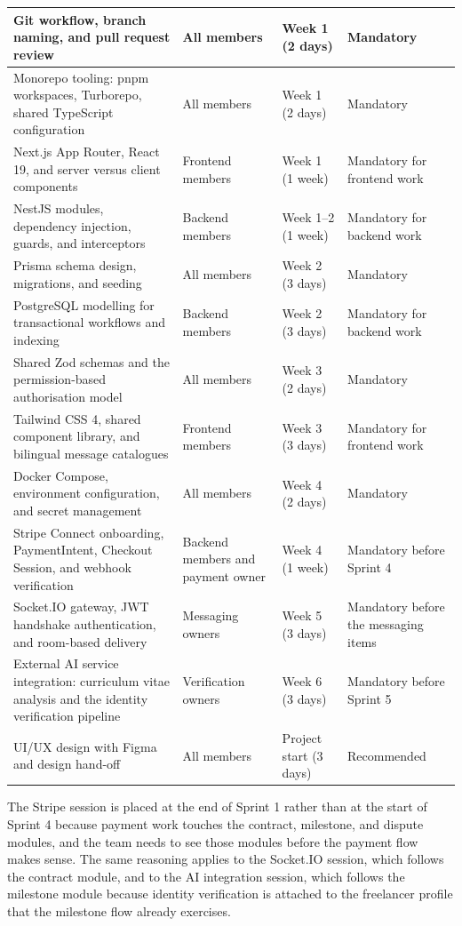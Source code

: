 \begin{longtable}{|>{\raggedright\arraybackslash}p{4.5cm}|>{\raggedright\arraybackslash}p{2.3cm}|>{\raggedright\arraybackslash}p{3.6cm}|>{\raggedright\arraybackslash}p{3.4cm}|}
Git workflow, branch naming, and pull request review & All members & Week 1 (2 days) & Mandatory \\
\hline
Monorepo tooling: pnpm workspaces, Turborepo, shared TypeScript configuration & All members & Week 1 (2 days) & Mandatory \\
\hline
Next.js App Router, React 19, and server versus client components & Frontend members & Week 1 (1 week) & Mandatory for frontend work \\
\hline
NestJS modules, dependency injection, guards, and interceptors & Backend members & Week 1--2 (1 week) & Mandatory for backend work \\
\hline
Prisma schema design, migrations, and seeding & All members & Week 2 (3 days) & Mandatory \\
\hline
PostgreSQL modelling for transactional workflows and indexing & Backend members & Week 2 (3 days) & Mandatory for backend work \\
\hline
Shared Zod schemas and the permission-based authorisation model & All members & Week 3 (2 days) & Mandatory \\
\hline
Tailwind CSS 4, shared component library, and bilingual message catalogues & Frontend members & Week 3 (3 days) & Mandatory for frontend work \\
\hline
Docker Compose, environment configuration, and secret management & All members & Week 4 (2 days) & Mandatory \\
\hline
Stripe Connect onboarding, PaymentIntent, Checkout Session, and webhook verification & Backend members and payment owner & Week 4 (1 week) & Mandatory before Sprint 4 \\
\hline
Socket.IO gateway, JWT handshake authentication, and room-based delivery & Messaging owners & Week 5 (3 days) & Mandatory before the messaging items \\
\hline
External AI service integration: curriculum vitae analysis and the identity verification pipeline & Verification owners & Week 6 (3 days) & Mandatory before Sprint 5 \\
\hline
UI/UX design with Figma and design hand-off & All members & Project start (3 days) & Recommended \\
\hline

\end{longtable}
\endgroup

The Stripe session is placed at the end of Sprint 1 rather than at the start of Sprint 4 because payment work touches the contract, milestone, and dispute modules, and the team needs to see those modules before the payment flow makes sense. The same reasoning applies to the Socket.IO session, which follows the contract module, and to the AI integration session, which follows the milestone module because identity verification is attached to the freelancer profile that the milestone flow already exercises.
